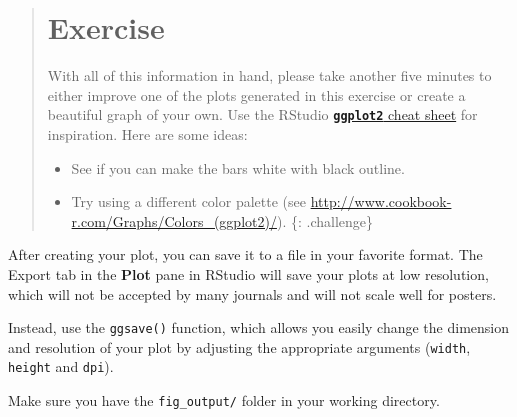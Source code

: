 \documentclass[]{book}
\providecommand{\tightlist}{%
  \setlength{\itemsep}{0pt}\setlength{\parskip}{0pt}}
\begin{document}
\begin{quote}
\section{Exercise}\label{exercise-15}

With all of this information in hand, please take another five minutes
to either improve one of the plots generated in this exercise or create
a beautiful graph of your own. Use the RStudio
\href{https://www.rstudio.com/wp-content/uploads/2016/11/ggplot2-cheatsheet-2.1.pdf}{\textbf{\texttt{ggplot2}}
cheat sheet} for inspiration. Here are some ideas:

\begin{itemize}
\tightlist
\item
  See if you can make the bars white with black outline.
\item
  Try using a different color palette (see
  \url{http://www.cookbook-r.com/Graphs/Colors_(ggplot2)/}). \{:
  .challenge\}
\end{itemize}
\end{quote}

After creating your plot, you can save it to a file in your favorite
format. The Export tab in the \textbf{Plot} pane in RStudio will save
your plots at low resolution, which will not be accepted by many
journals and will not scale well for posters.

Instead, use the \texttt{ggsave()} function, which allows you easily
change the dimension and resolution of your plot by adjusting the
appropriate arguments (\texttt{width}, \texttt{height} and
\texttt{dpi}).

Make sure you have the \texttt{fig\_output/} folder in your working
directory.
\end{document}
